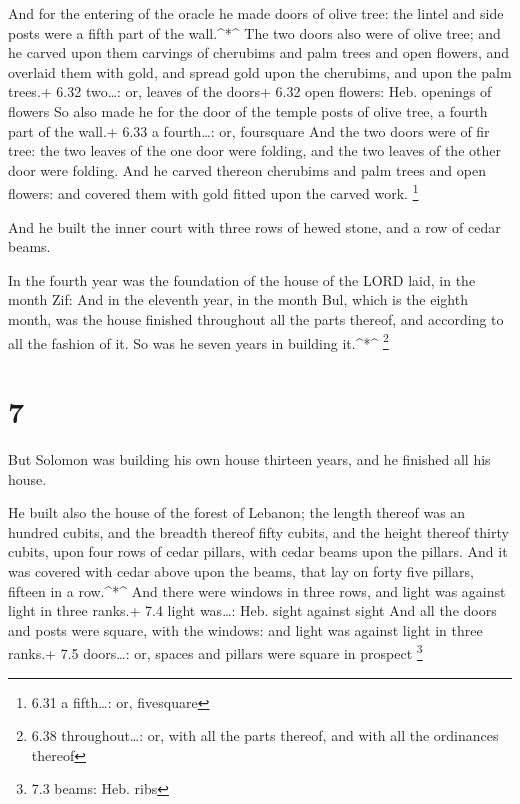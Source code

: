  And for the entering of the oracle he made doors of olive
tree: the lintel and side posts were a fifth part of the wall.\^{}*\^{}
 The two doors also were of olive tree; and he carved upon
them carvings of cherubims and palm trees and open flowers, and overlaid
them with gold, and spread gold upon the cherubims, and upon the palm
trees.+ 6.32 two\ldots: or, leaves of the doors+ 6.32 open flowers: Heb.
openings of flowers  So also made he for the door of the
temple posts of olive tree, a fourth part of the wall.+ 6.33 a
fourth\ldots: or, foursquare  And the two doors were of fir
tree: the two leaves of the one door were folding, and the two leaves of
the other door were folding.  And he carved thereon
cherubims and palm trees and open flowers: and covered them with gold
fitted upon the carved work. \footnote{6.31 a fifth\ldots: or,
  fivesquare}

 And he built the inner court with three rows of hewed
stone, and a row of cedar beams.

 In the fourth year was the foundation of the house of the
LORD laid, in the month Zif:  And in the eleventh year, in
the month Bul, which is the eighth month, was the house finished
throughout all the parts thereof, and according to all the fashion of
it. So was he seven years in building it.\^{}*\^{} \footnote{6.38
  throughout\ldots: or, with all the parts thereof, and with all the
  ordinances thereof}

\hypertarget{section-6}{%
\section{7}\label{section-6}}

 But Solomon was building his own house thirteen years, and
he finished all his house.

 He built also the house of the forest of Lebanon; the
length thereof was an hundred cubits, and the breadth thereof fifty
cubits, and the height thereof thirty cubits, upon four rows of cedar
pillars, with cedar beams upon the pillars.  And it was
covered with cedar above upon the beams, that lay on forty five pillars,
fifteen in a row.\^{}*\^{}  And there were windows in three
rows, and light was against light in three ranks.+ 7.4 light was\ldots:
Heb. sight against sight  And all the doors and posts were
square, with the windows: and light was against light in three ranks.+
7.5 doors\ldots: or, spaces and pillars were square in prospect
\footnote{7.3 beams: Heb. ribs}

